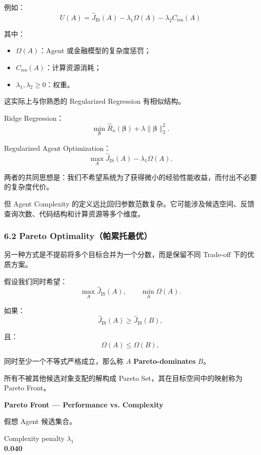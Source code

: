 例如：
\[\boxed{
U(A)
=
\widehat J_{\mathrm{IS}}(A)
-\lambda_1\Omega(A)
-\lambda_2C_{\mathrm{res}}(A)
}\]

其中：

\begin{itemize}
\tightlist
\item
  \(\Omega(A)\)：Agent 或金融模型的复杂度惩罚；
\item
  \(C_{\mathrm{res}}(A)\)：计算资源消耗；
\item
  \(\lambda_1,\lambda_2\geq0\)：权重。
\end{itemize}

这实际上与你熟悉的 Regularized Regression 有相似结构。

Ridge Regression：
\[\min_{\boldsymbol\beta}
\widehat R_n(\boldsymbol\beta)
+\lambda\|\boldsymbol\beta\|_2^2.\]

Regularized Agent Optimization：
\[\max_A
\widehat J_{\mathrm{IS}}(A)
-\lambda_1\Omega(A).\]

两者的共同思想是：我们不希望系统为了获得微小的经验性能收益，而付出不必要的复杂度代价。

但 Agent Complexity 的定义远比回归参数范数复杂。它可能涉及候选空间、反馈查询次数、代码结构和计算资源等多个维度。

\hypertarget{part-3-40-0001-pareto-optimalityux5e15ux7d2fux6258ux6700ux4f18}{%
\subsubsection{6.2 Pareto Optimality（帕累托最优）}\label{part-3-40-0001-pareto-optimalityux5e15ux7d2fux6258ux6700ux4f18}}

另一种方式是不提前将多个目标合并为一个分数，而是保留不同 Trade-off 下的优质方案。

假设我们同时希望：
\[\max_A\widehat J_{\mathrm{IS}}(A),
\qquad
\min_A\Omega(A).\]

如果：
\[\widehat J_{\mathrm{IS}}(A)
\geq
\widehat J_{\mathrm{IS}}(B),\]

且：
\[\Omega(A)\leq\Omega(B),\]

同时至少一个不等式严格成立，那么称 \(A\) \textbf{Pareto-dominates} \(B\)。

所有不被其他候选对象支配的解构成 Pareto Set，其在目标空间中的映射称为 Pareto Front。

\textbf{Pareto Front --- Performance vs. Complexity}

假想 Agent 候选集合。

Complexity penalty \(\lambda_1\)\\
\textbf{0.040}

